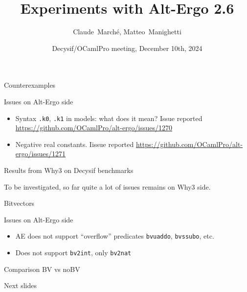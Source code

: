 \documentclass[aspectratio=169]{beamer}
\title{Experiments with Alt-Ergo 2.6}
\author{Claude~Marché, Matteo~Manighetti}
\date{Decysif/OCamlPro meeting, December 10th, 2024}
\begin{document}

\begin{frame}{}
  \maketitle
\end{frame}




\begin{frame}{Counterexamples}

  \begin{block}{Issues on Alt-Ergo side}
  \begin{itemize}
  \item Syntax \texttt{.k0}, \texttt{.k1} in models: what does it
    mean? Issue reported
    \url{https://github.com/OCamlPro/alt-ergo/issues/1270}
  \item Negative real constants. Iissue reported \url{https://github.com/OCamlPro/alt-ergo/issues/1271}
  \end{itemize}
\end{block}
\vfill
\begin{block}{Results from Why3 on Decysif benchmarks}

    To be investigated, so far quite a lot of issues remains on Why3
    side.

  \end{block}
\end{frame}

\begin{frame}{Bitvectors}

  \begin{block}{Issues on Alt-Ergo side}
  \begin{itemize}
  \item AE does not support ``overflow'' predicates \texttt{bvuaddo}, \texttt{bvssubo}, etc.

  \item Does not support \texttt{bv2int}, only \texttt{bv2nat}

  \end{itemize}

\end{block}

\vfill

  \begin{block}{Comparison BV vs noBV}

    Next slides

  \end{block}
\end{frame}
\end{document}
